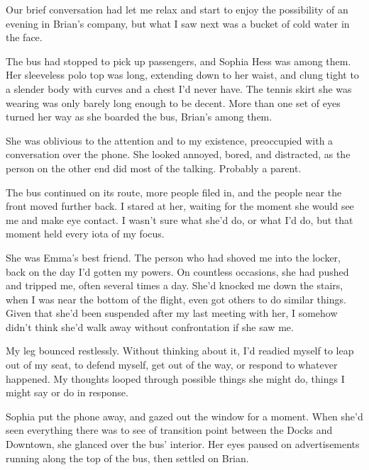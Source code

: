 Our brief conversation had let me relax and start to enjoy the possibility of an evening in Brian's company, but what I saw next was a bucket of cold water in the face.



The bus had stopped to pick up passengers, and Sophia Hess was among them.  Her sleeveless polo top was long, extending down to her waist, and clung tight to a slender body with curves and a chest I'd never have.  The tennis skirt she was wearing was only barely long enough to be decent.  More than one set of eyes turned her way as she boarded the bus, Brian's among them.



She was oblivious to the attention and to my existence, preoccupied with a conversation over the phone.  She looked annoyed, bored, and distracted, as the person on the other end did most of the talking.  Probably a parent.



The bus continued on its route, more people filed in, and the people near the front moved further back.  I stared at her, waiting for the moment she would see me and make eye contact.  I wasn't sure what she'd do, or what I'd do, but that moment held every iota of my focus.



She was Emma's best friend.  The person who had shoved me into the locker, back on the day I'd gotten my powers.  On countless occasions, she had pushed and tripped me, often several times a day.  She'd knocked me down the stairs, when I was near the bottom of the flight, even got others to do similar things.  Given that she'd been suspended after my last meeting with her, I somehow didn't think she'd walk away without confrontation if she saw me.



My leg bounced restlessly.  Without thinking about it, I'd readied myself to leap out of my seat, to defend myself, get out of the way, or respond to whatever happened.  My thoughts looped through possible things she might do, things I might say or do in response.



Sophia put the phone away, and gazed out the window for a moment.  When she'd seen everything there was to see of transition point between the Docks and Downtown, she glanced over the bus' interior.  Her eyes paused on advertisements running along the top of the bus, then settled on Brian.



